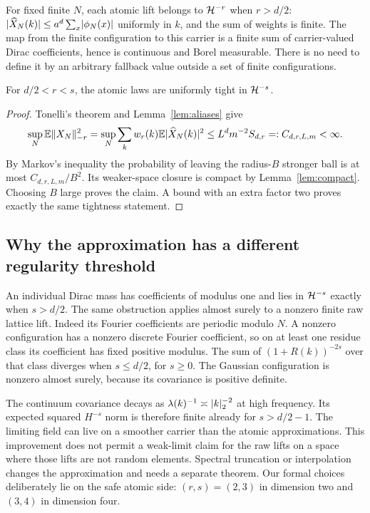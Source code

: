 For fixed finite $N$, each atomic lift belongs to $\mathcal H^{-r}$ when $r>d/2$:
$\lvert\widehat X_N(k)\rvert\leq a^d\sum_x\lvert\phi_N(x)\rvert$ uniformly in $k$,
and the sum of weights is finite. The map from the finite configuration to
this carrier is a finite sum of carrier-valued Dirac coefficients, hence is
continuous and Borel measurable. There is no need to define it by an
arbitrary fallback value outside a set of finite configurations.

\begin{proposition}\label{prop:tight}
For $d/2<r<s$, the atomic laws are uniformly tight in $\mathcal H^{-s}$.
\end{proposition}
\begin{proof}
Tonelli's theorem and Lemma~\ref{lem:aliases} give
\begin{equation}\label{eq:trace-moment}
 \sup_N\mathbb E\lVert X_N\rVert_{-r}^2
 =\sup_N\sum_kw_r(k)\mathbb E\lvert\widehat X_N(k)\rvert^2
 \leq L^dm^{-2}S_{d,r}=:C_{d,r,L,m}<\infty.
\end{equation}
By Markov's inequality the probability of leaving the radius-$B$ stronger
ball is at most $C_{d,r,L,m}/B^2$. Its weaker-space closure is compact by
Lemma~\ref{lem:compact}. Choosing $B$ large proves the claim.
A bound with an extra factor two proves exactly the same tightness statement.
\end{proof}

\subsection{Why the approximation has a different regularity threshold}
An individual Dirac mass has coefficients of modulus one and lies in
$\mathcal H^{-s}$ exactly when $s>d/2$. The same obstruction applies almost surely
to a nonzero finite raw lattice lift. Indeed its Fourier coefficients are
periodic modulo $N$. A nonzero configuration has a nonzero discrete Fourier
coefficient, so on at least one residue class its coefficient has fixed
positive modulus. The sum of $(1+R(k))^{-2s}$ over that class diverges when
$s\leq d/2$, for $s\geq0$. The Gaussian configuration is nonzero almost
surely, because its covariance is positive definite.

The continuum covariance decays as $\lambda(k)^{-1}\asymp\lvert k\rvert_2^{-2}$
at high frequency. Its expected squared $H^{-s}$ norm is therefore finite
already for $s>d/2-1$. The limiting field can live on a smoother carrier than
the atomic approximations. This improvement does not permit a weak-limit
claim for the raw lifts on a space where those lifts are not random elements.
Spectral truncation or interpolation changes the approximation and needs a
separate theorem. Our formal choices deliberately lie on the safe atomic
side: $(r,s)=(2,3)$ in dimension two and $(3,4)$ in dimension four.
